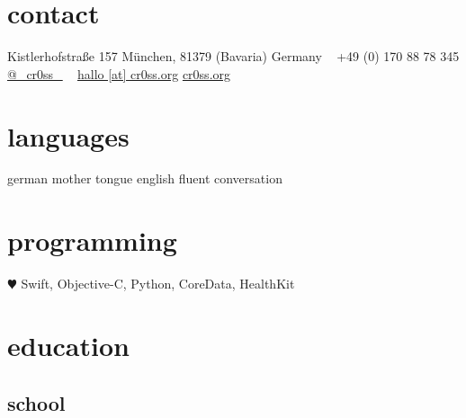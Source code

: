 \documentclass[]{friggeri-cv} %
\begin{document}


\begin{aside} %
\section{contact}
Kistlerhofstraße 157
M\"{u}nchen, 81379 (Bavaria)
Germany
~
+49 (0) 170 88 78 345
\href{https://twitter.com/_cr0ss_}{@\_cr0ss\_}
~
\href{mailto:hallo@cr0ss.org}{hallo [at] cr0ss.org}
\href{https://cr0ss.org}{cr0ss.org}
\section{languages}
german mother tongue
english fluent conversation
\section{programming}
{\color{red} $\varheartsuit$} Swift,
Objective-C, Python,
CoreData, HealthKit
\end{aside}


\section{education}

\subsection{school}
\end{document}
